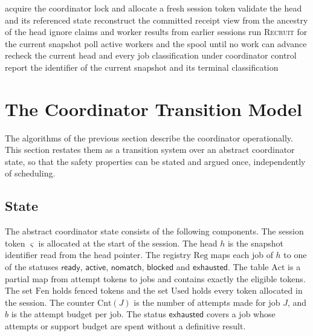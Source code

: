\documentclass[11pt,a4paper]{article}
\theoremstyle{plain}
\theoremstyle{definition}
\theoremstyle{remark}
\theoremstyle{definition}
\begin{document}
\begin{algorithm}
\caption{Recover and determine quiescence.}
\label{alg:recover}
\begin{algorithmic}[1]
  \State acquire the coordinator lock and allocate a fresh session token
  \State validate the head and its referenced state
  \State reconstruct the committed receipt view from the ancestry of the head
  \State ignore claims and worker results from earlier sessions
  \State run \textsc{Recruit} for the current snapshot
  \State poll active workers and the spool until no work can advance
  \State recheck the current head and every job classification under coordinator control
  \State report the identifier of the current snapshot and its terminal classification
\EndProcedure
\end{algorithmic}
\end{algorithm}

\section{The Coordinator Transition Model}
\label{sec:model}

The algorithms of the previous section describe the coordinator operationally. This section restates them as a transition system over an abstract coordinator state, so that the safety properties can be stated and argued once, independently of scheduling.

\subsection{State}

The abstract coordinator state consists of the following components. The session token $\varsigma$ is allocated at the start of the session. The head $h$ is the snapshot identifier read from the head pointer. The registry $\mathrm{Reg}$ maps each job of $h$ to one of the statuses $\mathsf{ready}$, $\mathsf{active}$, $\mathsf{nomatch}$, $\mathsf{blocked}$ and $\mathsf{exhausted}$. The table $\mathrm{Act}$ is a partial map from attempt tokens to jobs and contains exactly the eligible tokens. The set $\mathrm{Fen}$ holds fenced tokens and the set $\mathrm{Used}$ holds every token allocated in the session. The counter $\mathrm{Cnt}(J)$ is the number of attempts made for job $J$, and $b$ is the attempt budget per job. The status $\mathsf{exhausted}$ covers a job whose attempts or support budget are spent without a definitive result.
\end{document}
